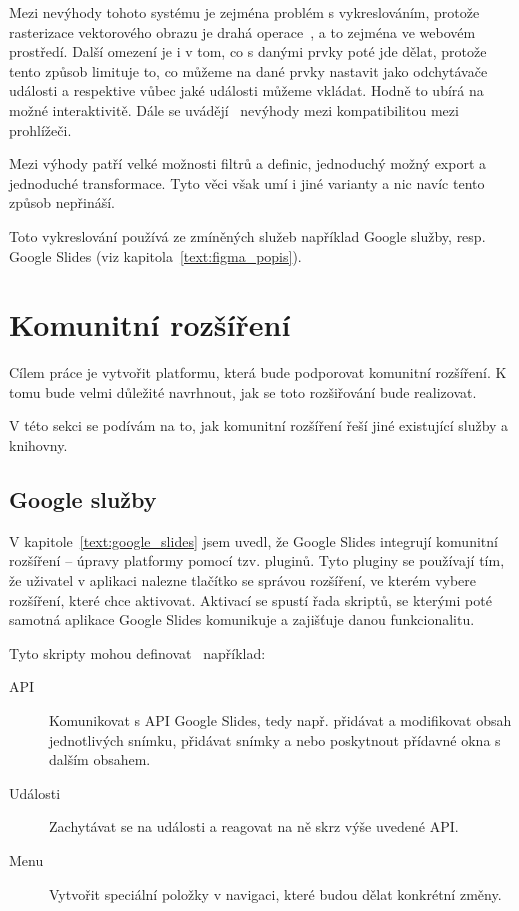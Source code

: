 Mezi nevýhody tohoto systému je zejména problém s vykreslováním, protože rasterizace vektorového obrazu je drahá operace~\cite{svg_css_html}, a to zejména ve webovém prostředí.
Další omezení je i v tom, co s danými prvky poté jde dělat, protože tento způsob limituje to, co můžeme na dané prvky nastavit jako odchytávače události a respektive vůbec jaké události můžeme vkládat.
Hodně to ubírá na možné interaktivitě.
Dále se uvádějí~\cite{svg_css_html} nevýhody mezi kompatibilitou mezi prohlížeči.

Mezi výhody patří velké možnosti filtrů a definic, jednoduchý možný export a jednoduché transformace.
Tyto věci však umí i jiné varianty a nic navíc tento způsob nepřináší.

Toto vykreslování používá ze zmíněných služeb například Google služby, resp. Google Slides (viz kapitola~\ref{text:figma_popis}).

\section{Komunitní rozšíření}\label{text:community_plugins}

Cílem práce je vytvořit platformu, která bude podporovat komunitní rozšíření.
K tomu bude velmi důležité navrhnout, jak se toto rozšiřování bude realizovat.

V této sekci se podívám na to, jak komunitní rozšíření řeší jiné existující služby a knihovny.

\subsection{Google služby}

V kapitole~\ref{text:google_slides} jsem uvedl, že Google Slides integrují komunitní rozšíření -- úpravy platformy pomocí tzv. pluginů.
Tyto pluginy se používají tím, že uživatel v aplikaci nalezne tlačítko se správou rozšíření, ve kterém vybere rozšíření, které chce aktivovat.
Aktivací se spustí řada skriptů, se kterými poté samotná aplikace Google Slides komunikuje a zajišťuje danou funkcionalitu.

Tyto skripty mohou definovat~\cite{google_apps} například:

\begin{description}
    \item[API] Komunikovat s API Google Slides, tedy např. přidávat a modifikovat obsah jednotlivých snímku, přidávat snímky a nebo poskytnout přídavné okna s dalším obsahem.
    \item[Události] Zachytávat se na události a reagovat na ně skrz výše uvedené API.
    \item[Menu] Vytvořit speciální položky v navigaci, které budou dělat konkrétní změny.
\end{description}

